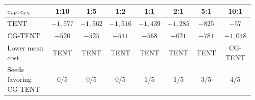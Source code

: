 \begin{tabular}{@{}lccccccc@{}}
\toprule
$c_{\mathrm{FP}}\!:\!c_{\mathrm{FN}}$ & 1:10 & 1:5 & 1:2 & 1:1 & 2:1 & 5:1 & 10:1 \\
\midrule
TENT & $-1{,}577$ & $-1{,}562$ & $-1{,}516$ & $-1{,}439$ & $-1{,}285$ & $-825$ & $-57$ \\
CG-TENT & $-520$ & $-525$ & $-541$ & $-568$ & $-621$ & $-781$ & $-1{,}048$ \\
\midrule
Lower mean cost & TENT & TENT & TENT & TENT & TENT & TENT & CG-TENT \\
Seeds favoring CG-TENT & 0/5 & 0/5 & 0/5 & 1/5 & 1/5 & 3/5 & 4/5 \\
\bottomrule
\end{tabular}
